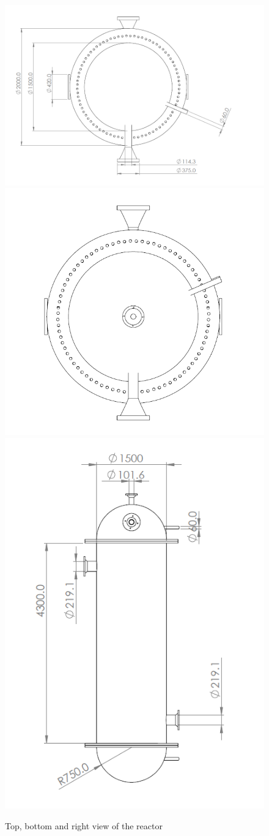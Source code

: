\begin{figure}[H]
    \centering
    \includegraphics[width=0.6\linewidth]{chapters/2-reaction/figures/FYD reactor bottom view with calc.PNG}
    \includegraphics[width=0.49\linewidth]{chapters/2-reaction/figures/FYD reactor top view.PNG}
    \includegraphics[width=0.49\linewidth]{chapters/2-reaction/figures/FYD reactor right view with calc.PNG}
    \caption{Top, bottom and right view of the reactor}
    \label{fig:reactortopbottomrightview}
\end{figure}

